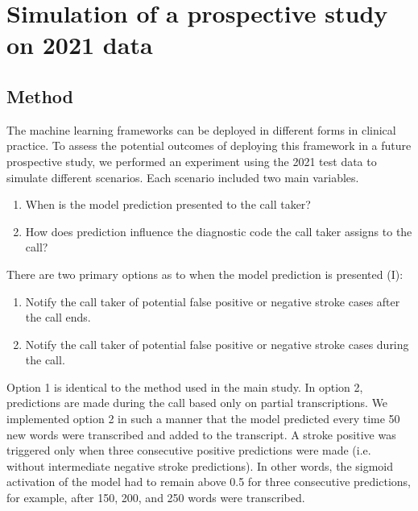 {\begin{table}
{\begin{tabular}{l|ccccc}
        \bottomrule
    \end{tabular}%
    }
\end{table}


\section{Simulation of a prospective study on 2021 data}

\subsection{Method}

The machine learning frameworks can be deployed in different forms in clinical practice. To assess the potential outcomes of deploying this framework in a future prospective study, we performed an experiment using the 2021 test data to simulate different scenarios. Each scenario included two main variables.
%
\begin{enumerate}[label=\Roman*.]
    \item When is the model prediction presented to the call taker?
    \item How does prediction influence the diagnostic code the call taker assigns to the call?
\end{enumerate}
%
There are two primary options as to when the model prediction is presented (I):
%
\begin{enumerate}
    \item Notify the call taker of potential false positive or negative stroke cases after the call ends.
    \item Notify the call taker of potential false positive or negative stroke cases during the call.
\end{enumerate}
%
Option 1 is identical to the method used in the main study. In option 2, predictions are made during the call based only on partial transcriptions. We implemented option 2 in such a manner that the model predicted every time 50 new words were transcribed and added to the transcript. A stroke positive was triggered only when three consecutive positive predictions were made (i.e. without intermediate negative stroke predictions). In other words, the sigmoid activation of the model had to remain above 0.5 for three consecutive predictions, for example, after 150, 200, and 250 words were transcribed.

}
